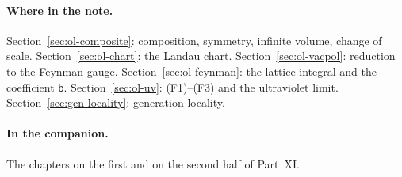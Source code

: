 \paragraph{Where in the note.} Section~\ref{sec:ol-composite}: composition, symmetry, infinite volume, change of scale. Section~\ref{sec:ol-chart}: the Landau chart. Section~\ref{sec:ol-vacpol}: reduction to the Feynman gauge. Section~\ref{sec:ol-feynman}: the lattice integral and the coefficient $\mathsf b$. Section~\ref{sec:ol-uv}: (F1)--(F3) and the ultraviolet limit. Section~\ref{sec:gen-locality}: generation locality.

\paragraph{In the companion.} The chapters on the first and on the second half of Part~XI.
